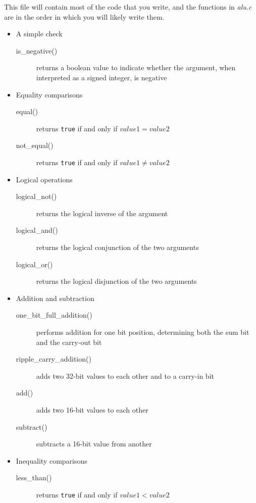 This file will contain most of the code that you write, and the functions in \textit{alu.c} are in the order in which you will likely write them.
\begin{itemize}
    \item A simple check
        \begin{description}
            \item[is\_negative()] returns a boolean value to indicate whether the argument, when interpreted as a signed integer, is negative
        \end{description}
    \item Equality comparisons
        \begin{description}
            \item[equal()] returns \lstinline{true} if and only if $value1 = value2$
            \item[not\_equal()] returns \lstinline{true} if and only if $value1 \not = value2$
        \end{description}
    \item Logical operations
        \begin{description}
            \item[logical\_not()] returns the logical inverse of the argument
            \item[logical\_and()] returns the logical conjunction of the two arguments
            \item[logical\_or()] returns the logical disjunction of the two arguments
        \end{description}
    \item Addition and subtraction
        \begin{description}
            \item[one\_bit\_full\_addition()] performs addition for one bit position, determining both the sum bit and the carry-out bit
            \item[ripple\_carry\_addition()] adds two 32-bit values to each other and to a carry-in bit
            \item[add()] adds two 16-bit values to each other
            \item[subtract()] subtracts a 16-bit value from another
        \end{description}
    \item Inequality comparisons
        \begin{description}
            \item[less\_than()] returns \lstinline{true} if and only if $value1 < value2$

\end{description}
\end{itemize}
